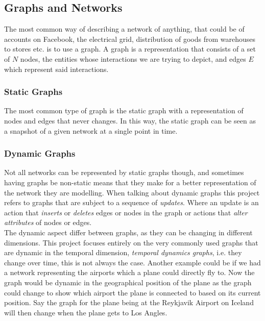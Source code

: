 \subsection{Graphs and Networks}
\label{sec:Method:Graphs}
The most common way of describing a network of anything, that could be of accounts on Facebook, the electrical grid, distribution of goods from warehouses to stores etc. is to use a graph.
A graph is a representation that consists of a set of $N$ nodes, the entities whose interactions we are trying to depict, and edges $E$ which represent said interactions.

\subsubsection{Static Graphs}
\label{sec:Method:Graphs:StaticGraphs}
The most common type of graph is the static graph with a representation of nodes and edges that never changes. 
In this way, the static graph can be seen as a snapshot of a given network at a single point in time.


\subsubsection{Dynamic Graphs}
\label{sec:Method:Graphs:DynamicGraphs}
Not all networks can be represented by static graphs though, and sometimes having graphs be non-static means that they make for a better representation of the network they are modelling. When talking about dynamic graphs this project refers to graphs that are subject to a sequence of \textit{updates}. Where an update is an action that \textit{inserts} or \textit{deletes} edges or nodes in the graph or actions that \textit{alter attributes} of nodes or edges.
\\
The dynamic aspect differ between graphs, as they can be changing in different dimensions. This project focuses entirely on the very commonly used graphs that are dynamic in the temporal dimension, \textit{temporal dynamics graphs}, i.e. they change over time, this is not always the case. Another example could be if we had a network representing the airports which a plane could directly fly to. Now the graph would be dynamic in the geographical position of the plane as the graph could change to show which airport the plane is connected to based on its current position. Say the graph for the plane being at the Reykjavik Airport on Iceland will then change when the plane gets to Los Angles.












